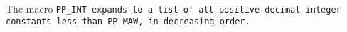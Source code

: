 The macro \tt{PP_INT} expands to a list of all positive decimal
integer constants less than \tt{PP_MAW}, in decreasing order.
